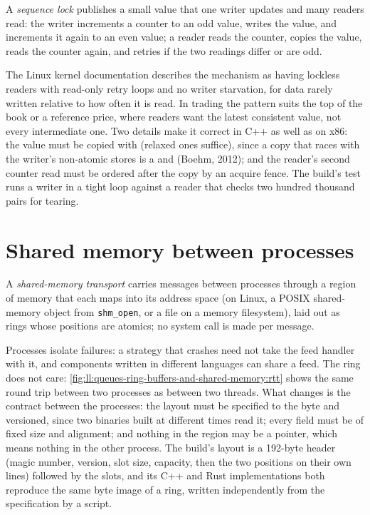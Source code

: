 \begin{definition}\label{def:ll:queues-ring-buffers-and-shared-memory:seqlock}
A \emph{sequence lock} publishes a small value that one writer updates and many readers read: the writer
increments a counter to an odd value, writes the value, and increments it again to an even value; a reader reads the
counter, copies the value, reads the counter again, and retries if the two readings differ or are odd.
\end{definition}

The Linux kernel documentation describes the mechanism as having lockless readers with read-only retry loops and no writer
starvation, for data rarely written relative to how often it is read. In trading the pattern suits the top of the book or a
reference price, where readers want the latest consistent value, not every intermediate one. Two details make it correct in
C++ as well as on x86: the value must be copied with  (relaxed ones suffice), since a copy that races with
the writer's non-atomic stores is a  and  (Boehm, 2012); and the reader's second counter read
must be ordered after the copy by an acquire fence. The build's test runs a writer in a tight loop against a reader that
checks two hundred thousand pairs for tearing.

\section{Shared memory between processes}

\begin{definition}\label{def:ll:queues-ring-buffers-and-shared-memory:shm}
A \emph{shared-memory transport} carries messages between processes through a region of memory
that each maps into its address space (on Linux, a POSIX shared-memory object from \texttt{shm\_open}, or a file on a
memory filesystem), laid out as rings whose positions are atomics; no system call is made per message.
\end{definition}

Processes isolate failures: a strategy that crashes need not take the feed handler with it, and components written in
different languages can share a feed. The ring does not care: \cref{fig:ll:queues-ring-buffers-and-shared-memory:rtt} shows
the same round trip between two processes as between two threads. What changes is the contract between the processes: the
layout must be specified to the byte and versioned, since two binaries built at different times read it; every field must
be of fixed size and alignment; and nothing in the region may be a pointer, which means nothing in the other process.
The build's layout is a 192-byte header (magic number, version, slot size, capacity, then the two positions on their own
lines) followed by the slots, and its C++ and Rust implementations both reproduce the same byte image of a ring, written
independently from the specification by a script.

